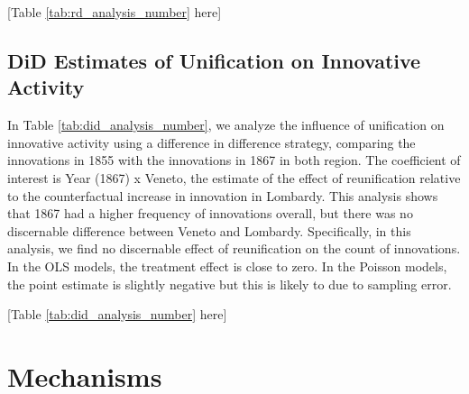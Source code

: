 \begin{center}
    [Table \ref{tab:rd_analysis_number} here]
\end{center}

\subsection{DiD Estimates of Unification on Innovative Activity}

In Table \ref{tab:did_analysis_number}, we analyze the influence of unification on innovative activity using a difference in difference strategy, comparing the innovations in 1855 with the innovations in 1867 in both region. The coefficient of interest is Year (1867) x Veneto, the estimate of the effect of reunification relative to the counterfactual increase in innovation in Lombardy. This analysis shows that 1867 had a higher frequency of innovations overall, but there was no discernable difference between Veneto and Lombardy. Specifically, in this analysis, we find no discernable effect of reunification on the count of innovations. In the OLS models, the treatment effect is close to zero. In the Poisson models, the point estimate is slightly negative but this is likely to due to sampling error. 

\begin{center}
    [Table \ref{tab:did_analysis_number} here]
\end{center}

\section{Mechanisms}







